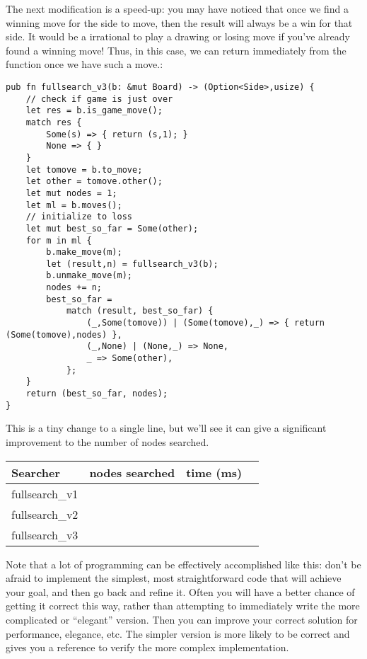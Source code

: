 \documentclass[10pt,dvipdfmx,letterpaper]{report}
\begin{document}
The next modification is a speed-up: you may have noticed that once we find a winning move for the side
to move, then the result will always be a win for that side. It would be a irrational to play a drawing or losing move
if you've already found a winning move!  Thus, in this case, we can return immediately from the function once we have such a
move.:
{\scriptsize\begin{verbatim}
pub fn fullsearch_v3(b: &mut Board) -> (Option<Side>,usize) {
    // check if game is just over
    let res = b.is_game_move();
    match res {
        Some(s) => { return (s,1); }
        None => { }
    }
    let tomove = b.to_move;
    let other = tomove.other();
    let mut nodes = 1;
    let ml = b.moves();
    // initialize to loss
    let mut best_so_far = Some(other);
    for m in ml {
        b.make_move(m);
        let (result,n) = fullsearch_v3(b);
        b.unmake_move(m);
        nodes += n;
        best_so_far =
            match (result, best_so_far) {
                (_,Some(tomove)) | (Some(tomove),_) => { return (Some(tomove),nodes) },
                (_,None) | (None,_) => None,
                _ => Some(other),
            };
    }
    return (best_so_far, nodes);
}
\end{verbatim}
}
This is a tiny change to a single line, but we'll see it can give a significant improvement to
the number of nodes searched.

\begin{center}
\begin{tabular}{ll|rr}
    Searcher       & nodes searched & time (ms) \\\hline
    fullsearch\_v1 &                &           \\
    fullsearch\_v2 &                &           \\
    fullsearch\_v3 &                &           \\
\end{tabular}
\end{center}

Note that a lot of programming can be effectively accomplished like this:
don't be afraid to implement
the simplest, most straightforward code that will achieve your goal, and then
go back and refine it.  Often you will have a better chance of getting it correct
this way, rather than attempting to immediately write the more complicated or
``elegant'' version.  Then you can improve your correct solution for performance,
elegance, etc.  The simpler version is more likely to be correct and gives you
a reference to verify the more complex implementation.
\end{document}
